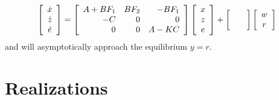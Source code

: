 \documentclass{article}
\begin{document}
$$
\left[\begin{array}{c}
  \dot{x} \\
  \dot{z} \\
  \dot{e}
\end{array}\right] =
\left[\begin{array}{r r r}
  A + B F_1 & B F_2 & -B F_1 \\
  -C        & 0     &  0     \\
   0        & 0     &  A - K C
\end{array}\right]
\left[\begin{array}{c}
  x \\
  z \\
  e
\end{array}\right]
+
\left[\begin{array}{c}
  \quad \\
  \quad
\end{array}\right]
\left[\begin{array}{c}
  w \\
  r
\end{array}\right]
$$
and will asymptotically approach the equilibrium $y = r$.


\section{Realizations}
\end{document}
